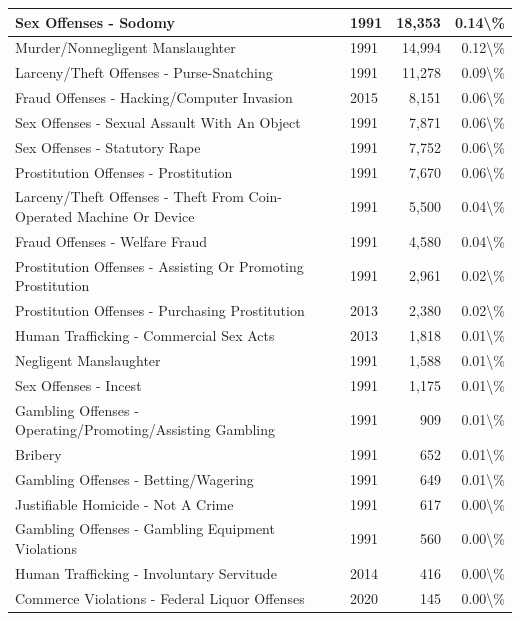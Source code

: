 \documentclass[
]{krantz}
\begin{document}
\begin{longtable}[t]{l|l|r|r}
\hline
Sex Offenses - Sodomy & 1991 & 18,353 & 0.14\textbackslash{}\%\\
\hline
Murder/Nonnegligent Manslaughter & 1991 & 14,994 & 0.12\textbackslash{}\%\\
\hline
Larceny/Theft Offenses - Purse-Snatching & 1991 & 11,278 & 0.09\textbackslash{}\%\\
\hline
Fraud Offenses - Hacking/Computer Invasion & 2015 & 8,151 & 0.06\textbackslash{}\%\\
\hline
Sex Offenses - Sexual Assault With An Object & 1991 & 7,871 & 0.06\textbackslash{}\%\\
\hline
Sex Offenses - Statutory Rape & 1991 & 7,752 & 0.06\textbackslash{}\%\\
\hline
Prostitution Offenses - Prostitution & 1991 & 7,670 & 0.06\textbackslash{}\%\\
\hline
Larceny/Theft Offenses - Theft From Coin-Operated Machine Or Device & 1991 & 5,500 & 0.04\textbackslash{}\%\\
\hline
Fraud Offenses - Welfare Fraud & 1991 & 4,580 & 0.04\textbackslash{}\%\\
\hline
Prostitution Offenses - Assisting Or Promoting Prostitution & 1991 & 2,961 & 0.02\textbackslash{}\%\\
\hline
Prostitution Offenses - Purchasing Prostitution & 2013 & 2,380 & 0.02\textbackslash{}\%\\
\hline
Human Trafficking - Commercial Sex Acts & 2013 & 1,818 & 0.01\textbackslash{}\%\\
\hline
Negligent Manslaughter & 1991 & 1,588 & 0.01\textbackslash{}\%\\
\hline
Sex Offenses - Incest & 1991 & 1,175 & 0.01\textbackslash{}\%\\
\hline
Gambling Offenses - Operating/Promoting/Assisting Gambling & 1991 & 909 & 0.01\textbackslash{}\%\\
\hline
Bribery & 1991 & 652 & 0.01\textbackslash{}\%\\
\hline
Gambling Offenses - Betting/Wagering & 1991 & 649 & 0.01\textbackslash{}\%\\
\hline
Justifiable Homicide - Not A Crime & 1991 & 617 & 0.00\textbackslash{}\%\\
\hline
Gambling Offenses - Gambling Equipment Violations & 1991 & 560 & 0.00\textbackslash{}\%\\
\hline
Human Trafficking - Involuntary Servitude & 2014 & 416 & 0.00\textbackslash{}\%\\
\hline
Commerce Violations - Federal Liquor Offenses & 2020 & 145 & 0.00\textbackslash{}\%\\

\end{longtable}
\end{document}
